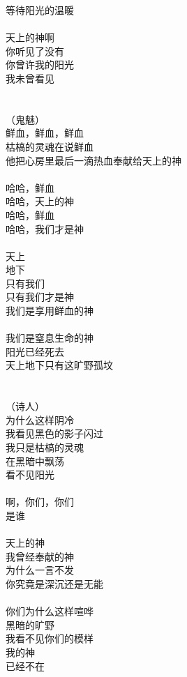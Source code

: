 等待阳光的温暖\\
\\
天上的神啊\\
你听见了没有\\
你曾许我的阳光\\
我未曾看见\\
\\
\\
（鬼魅）\\
鲜血，鲜血，鲜血\\
枯槁的灵魂在说鲜血\\
他把心房里最后一滴热血奉献给天上的神\\
\\
哈哈，鲜血\\
哈哈，天上的神\\
哈哈，鲜血\\
哈哈，我们才是神\\
\\
天上\\
地下\\
只有我们\\
只有我们才是神\\
我们是享用鲜血的神\\
\\
我们是窒息生命的神\\
阳光已经死去\\
天上地下只有这旷野孤坟\\
\\
\\
（诗人）\\
为什么这样阴冷\\
我看见黑色的影子闪过\\
我只是枯槁的灵魂\\
在黑暗中飘荡\\
看不见阳光\\
\\
啊，你们，你们\\
是谁\\
\\
天上的神\\
我曾经奉献的神\\
为什么一言不发\\
你究竟是深沉还是无能\\
\\
你们为什么这样喧哗\\
黑暗的旷野\\
我看不见你们的模样\\
我的神\\
已经不在\\

